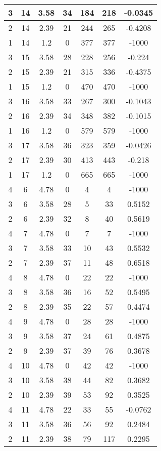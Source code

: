 \documentclass[letterpaper, 12pt]{article}
\begin{document}
\begin{longtable}{|c|c|c|c|c|c|c|}
\hline
3 & 14 & 3.58 & 34 & 184 & 218 & -0.0345 \\
\hline
2 & 14 & 2.39 & 21 & 244 & 265 & -0.4208 \\
\hline
1 & 14 & 1.2 & 0 & 377 & 377 & -1000 \\
\hline
3 & 15 & 3.58 & 28 & 228 & 256 & -0.224 \\
\hline
2 & 15 & 2.39 & 21 & 315 & 336 & -0.4375 \\
\hline
1 & 15 & 1.2 & 0 & 470 & 470 & -1000 \\
\hline
3 & 16 & 3.58 & 33 & 267 & 300 & -0.1043 \\
\hline
2 & 16 & 2.39 & 34 & 348 & 382 & -0.1015 \\
\hline
1 & 16 & 1.2 & 0 & 579 & 579 & -1000 \\
\hline
3 & 17 & 3.58 & 36 & 323 & 359 & -0.0426 \\
\hline
2 & 17 & 2.39 & 30 & 413 & 443 & -0.218 \\
\hline
1 & 17 & 1.2 & 0 & 665 & 665 & -1000 \\
\hline
4 & 6 & 4.78 & 0 & 4 & 4 & -1000 \\
\hline
3 & 6 & 3.58 & 28 & 5 & 33 & 0.5152 \\
\hline
2 & 6 & 2.39 & 32 & 8 & 40 & 0.5619 \\
\hline
4 & 7 & 4.78 & 0 & 7 & 7 & -1000 \\
\hline
3 & 7 & 3.58 & 33 & 10 & 43 & 0.5532 \\
\hline
2 & 7 & 2.39 & 37 & 11 & 48 & 0.6518 \\
\hline
4 & 8 & 4.78 & 0 & 22 & 22 & -1000 \\
\hline
3 & 8 & 3.58 & 36 & 16 & 52 & 0.5495 \\
\hline
2 & 8 & 2.39 & 35 & 22 & 57 & 0.4474 \\
\hline
4 & 9 & 4.78 & 0 & 28 & 28 & -1000 \\
\hline
3 & 9 & 3.58 & 37 & 24 & 61 & 0.4875 \\
\hline
2 & 9 & 2.39 & 37 & 39 & 76 & 0.3678 \\
\hline
4 & 10 & 4.78 & 0 & 42 & 42 & -1000 \\
\hline
3 & 10 & 3.58 & 38 & 44 & 82 & 0.3682 \\
\hline
2 & 10 & 2.39 & 39 & 53 & 92 & 0.3525 \\
\hline
4 & 11 & 4.78 & 22 & 33 & 55 & -0.0762 \\
\hline
3 & 11 & 3.58 & 36 & 56 & 92 & 0.2484 \\
\hline
2 & 11 & 2.39 & 38 & 79 & 117 & 0.2295 \\

\end{longtable}
\end{document}
